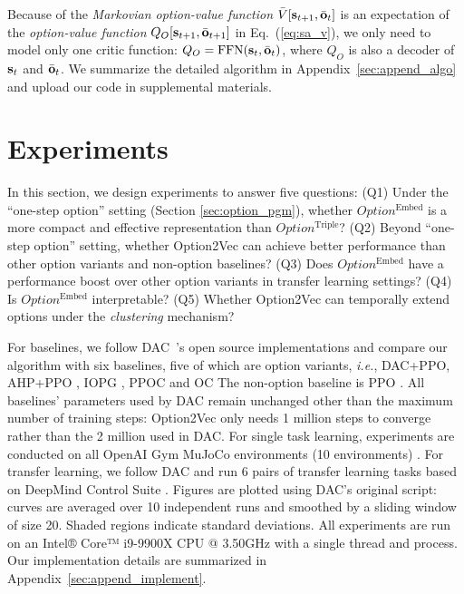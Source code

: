 \documentclass{article}
\begin{document}
Because of the \emph{Markovian option-value function} $\bar{V}[
{\mathbf{s}}_{t+1},\bar{{\mathbf{o}}}_{t} ]$ is an expectation of the
\emph{option-value function} $Q_O[{\mathbf{s}}_{t+1},\bar{{\mathbf{o}}}_{t+1}]$
in Eq.~(\ref{eq:sa_v}), we only need to model only one critic
function: $Q_O=\text{FFN}({\mathbf{s}}_t,\bar{{\mathbf{o}}}_t)$, where $Q_O$ is
also a decoder of ${\mathbf{s}}_t$ and $\bar{{\mathbf{o}}}_t$. We summarize the
detailed algorithm in Appendix~\ref{sec:append_algo} and upload
our code in supplemental materials.

\vspace{-3mm}
\section{Experiments}
\label{sec:exp}
\vspace{-2mm}
In this section, we design experiments to answer five questions:
(Q1) Under the ``one-step option'' setting (Section
\ref{sec:option_pgm}), whether $Option^{\textrm{Embed}}$ is a more compact and effective representation than
$Option^{\textrm{Triple}}$? (Q2) Beyond ``one-step option''
setting, whether Option2Vec can achieve better performance than other option variants and non-option baselines? (Q3) Does $Option^{\textrm{Embed}}$ have a performance boost over other option variants in transfer learning settings? (Q4) Is $Option^{\textrm{Embed}}$ interpretable? (Q5) Whether Option2Vec can temporally extend options under the \emph{clustering} mechanism?

For baselines, we follow DAC~\cite{zhang2019dac}'s open source
implementations and compare our algorithm with six baselines,
five of which are option variants, \textit{i.e.}, DAC+PPO, AHP+PPO
\cite{levy2011unified}, IOPG \cite{smith2018inference}, PPOC
\cite{klissarov2017learnings} and OC \cite{bacon2017option} The
non-option baseline is PPO \cite{schulman2017proximal}. All
baselines' parameters used by DAC remain unchanged other than the
maximum number of training steps: Option2Vec only needs 1 million
steps to converge rather than the 2 million used in DAC. For
single task learning, experiments are conducted on all OpenAI Gym
MuJoCo environments (10 environments) \cite{brockman2016openai}.
For transfer learning, we follow DAC and run 6 pairs of transfer
learning tasks based on DeepMind Control Suite
\cite{tassa2020dmcontrol}. Figures are plotted using DAC's
original script: curves are averaged over 10 independent runs and
smoothed by a sliding window of size 20. Shaded regions indicate
standard deviations. All experiments are run on an Intel® Core™
i9-9900X CPU @ 3.50GHz with a single thread and process. Our
implementation details are summarized in
Appendix~\ref{sec:append_implement}.
\end{document}
